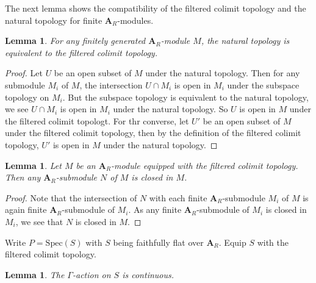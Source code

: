 \documentclass[10pt]{article}
\newtheorem{lem}[thm]{Lemma}
\numberwithin{equation}{section}
\newcommand{\Spec}{{\mathrm{Spec}}}         %
\newcommand{\bfA}{{\textbf{A}}}
\begin{document}
The next lemma shows the compatibility of the filtered colimit topology and the natural topology for finite $\bfA_R$-modules.
\begin{lem}
    For any finitely generated $\bfA_R$-module $M$, the natural topology is equivalent to the filtered colimit topology.
\end{lem}
\begin{proof}
    Let $U$ be an open subset of $M$ under the natural topology. Then for any submodule $M_i$ of $M$, the intersection $U\cap M_i$ is open in $M_i$ under the subspace topology on $M_i$. But the subspace topology is equivalent to the natural topology, we see $U\cap M_i$ is open in $M_i$ under the natural topology. So $U$ is open in $M$ under the filtered colimit topologt. For thr converse, let $U'$ be an open subset of $M$ under the filtered colimit topology, then by the definition of the filtered colimit topology, $U'$ is open in $M$ under the natural topology.
\end{proof}

\begin{lem}
    Let $M$ be an $\bfA_R$-module equipped with the filtered colimit topology. Then any $\bfA_R$-submodule $N$ of $M$ is closed in $M$.
\end{lem}
\begin{proof}
    Note that the intersection of $N$ with each finite $\bfA_R$-submodule $M_i$ of $M$ is again finite $\bfA_R$-submodule of $M_i$. As any finite $\bfA_R$-submodule of $M_i$ is closed in $M_i$, we see that $N$ is closed in $M$.
\end{proof}

Write $P=\Spec(S)$ with $S$ being faithfully flat over $\bfA_R$. Equip $S$ with the filtered colimit topology.

\begin{lem}\label{Key-0}
    The $\Gamma$-action on $S$ is continuous.
\end{lem}
\end{document}
